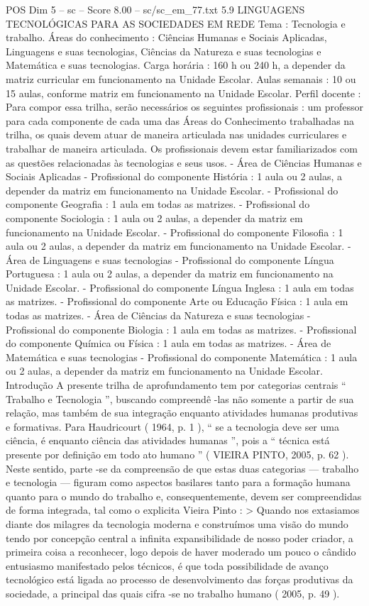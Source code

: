 \begin{textsample}{POS Dim 5 – sc – Score 8.00 – sc/sc\_em\_77.txt}  \label{ex:f5_pos_032}
5.9 LINGUAGENS TECNOLÓGICAS PARA AS SOCIEDADES EM REDE Tema : Tecnologia e trabalho.
Áreas do conhecimento : Ciências Humanas e Sociais Aplicadas, Linguagens e suas tecnologias, Ciências da Natureza e suas tecnologias e Matemática e suas tecnologias.
Carga horária : 160 h ou 240 h, a depender da matriz curricular em funcionamento na Unidade Escolar.
Aulas semanais : 10 ou 15 aulas, conforme matriz em funcionamento na Unidade Escolar.
Perfil docente : Para compor essa trilha, serão necessários os seguintes profissionais : um professor para cada componente de cada uma das Áreas do Conhecimento trabalhadas na trilha, os quais devem atuar de maneira articulada nas unidades curriculares e trabalhar de maneira articulada.
Os profissionais devem estar familiarizados com as questões relacionadas às tecnologias e seus usos. - Área de Ciências Humanas e Sociais Aplicadas - Profissional do componente História : 1 aula ou 2 aulas, a depender da matriz em funcionamento na Unidade Escolar. - Profissional do componente Geografia : 1 aula em todas as matrizes. - Profissional do componente Sociologia : 1 aula ou 2 aulas, a depender da matriz em funcionamento na Unidade Escolar. - Profissional do componente Filosofia : 1 aula ou 2 aulas, a depender da matriz em funcionamento na Unidade Escolar. - Área de Linguagens e suas tecnologias - Profissional do componente Língua Portuguesa : 1 aula ou 2 aulas, a depender da matriz em funcionamento na Unidade Escolar. - Profissional do componente Língua Inglesa : 1 aula em todas as matrizes. - Profissional do componente Arte ou Educação Física : 1 aula em todas as matrizes. - Área de Ciências da Natureza e suas tecnologias - Profissional do componente Biologia : 1 aula em todas as matrizes. - Profissional do componente Química ou Física : 1 aula em todas as matrizes. - Área de Matemática e suas tecnologias - Profissional do componente Matemática : 1 aula ou 2 aulas, a depender da matriz em funcionamento na Unidade Escolar.
Introdução A presente trilha de aprofundamento tem por categorias centrais “ Trabalho e Tecnologia ”, buscando compreendê -las não somente a partir de sua relação, mas também de sua integração enquanto atividades humanas produtivas e formativas.
Para Haudricourt ( 1964, p. 1 ), “ se a tecnologia deve ser uma ciência, é enquanto ciência das atividades humanas ”, pois a “ técnica está presente por definição em todo ato humano ” ( VIEIRA PINTO, 2005, p. 62 ).
Neste sentido, parte -se da compreensão de que estas duas categorias — trabalho e tecnologia — figuram como aspectos basilares tanto para a formação humana quanto para o mundo do trabalho e, consequentemente, devem ser compreendidas de forma integrada, tal como o explicita Vieira Pinto : > Quando nos extasiamos diante dos milagres da tecnologia moderna e construímos uma visão do mundo tendo por concepção central a infinita expansibilidade de nosso poder criador, a primeira coisa a reconhecer, logo depois de haver moderado um pouco o cândido entusiasmo manifestado pelos técnicos, é que toda possibilidade de avanço tecnológico está ligada ao processo de desenvolvimento das forças produtivas da sociedade, a principal das quais cifra -se no trabalho humano ( 2005, p. 49 ).

\end{textsample}
